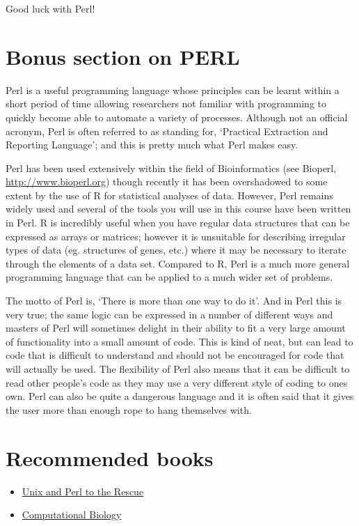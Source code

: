 \documentclass[11pt]{article}
\begin{document}
Good luck with Perl!
\section{Bonus section on PERL}
\label{sec-5}


Perl is a useful programming language whose principles can be learnt
within a short period of time allowing researchers not familiar with
programming to quickly become able to automate a variety of processes.
Although not an official acronym, Perl is often referred to as standing
for, `Practical Extraction and Reporting Language'; and this is pretty much
what Perl makes easy.

Perl has been used extensively within the field of Bioinformatics (see
Bioperl, \href{http://www.bioperl.org}{http://www.bioperl.org}) though recently it has been overshadowed to
some extent by the use of R for statistical analyses of data. However,
Perl remains widely used and several of the tools you will use in this
course have been written in Perl. R is incredibly useful when you have
regular data structures that can be expressed as arrays or matrices;
however it is unsuitable for describing irregular types of data (eg.
structures of genes, etc.) where it may be necessary to iterate through
the elements of a data set. Compared to R, Perl is a much more general
programming language that can be applied to a much wider set of
problems.

The motto of Perl is, `There is more than one way to do it'. And in Perl
this is very true; the same logic can be expressed in a number of
different ways and masters of Perl will sometimes delight in their
ability to fit a very large amount of functionality into a small amount
of code. This is kind of neat, but can lead to code that is difficult to
understand and should not be encouraged for code that will
actually be used. The flexibility of Perl also means that it can be
difficult to read other people's code as they may use a very different
style of coding to ones own. Perl can also be quite a dangerous language
and it is often said that it gives the user more than enough rope to
hang themselves with.
\section{Recommended books}
\label{sec-6}

\begin{itemize}
\item \href{http://unixandperl.com/}{Unix and Perl to the Rescue}
\item \href{http://www.staff.hs-mittweida.de/~wuenschi/doku.php?id=rwbook2}{Computational Biology}
\end{itemize}
\end{document}
